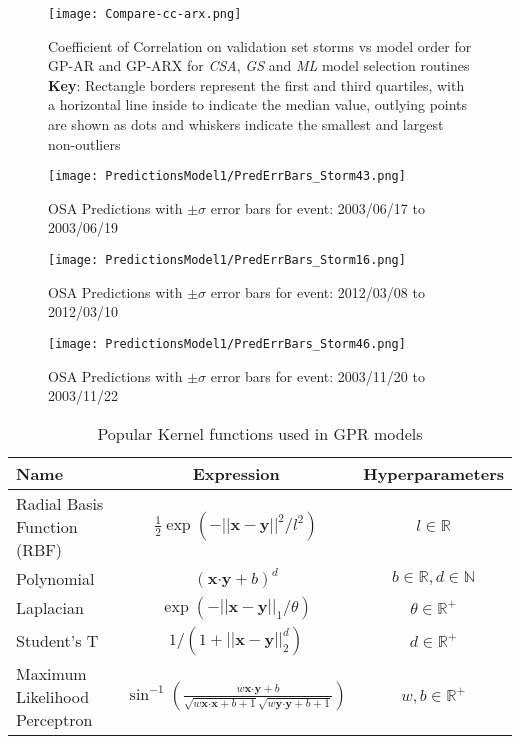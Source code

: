     \begin{figure}
    \noindent\texttt{[image: Compare-cc-arx.png]}
    \caption{Coefficient of Correlation on validation set storms vs model order for GP-AR and GP-ARX for \emph{CSA}, \emph{GS} and \emph{ML} model selection routines \\ \textbf{Key}: Rectangle borders represent the first and third quartiles, with a horizontal line inside to indicate the median value, outlying points are shown as dots and whiskers indicate the smallest and largest non-outliers}
    \label{fig:CompareCCARX}
    \end{figure}
    
    
    \begin{figure}
    \noindent\texttt{[image: PredictionsModel1/PredErrBars\_Storm43.png]}
    \caption{OSA Predictions with $\pm \sigma$ error bars for event: 2003/06/17 to 2003/06/19}
    \label{fig:ComparePred1}
    \end{figure}
    
    
    \begin{figure}
    \noindent\texttt{[image: PredictionsModel1/PredErrBars\_Storm16.png]}
    \caption{OSA Predictions with $\pm \sigma$ error bars for event: 2012/03/08 to 2012/03/10}
    \label{fig:ComparePred2}
    \end{figure}
    
    \begin{figure}
    \noindent\texttt{[image: PredictionsModel1/PredErrBars\_Storm46.png]}
    \caption{OSA Predictions with $\pm \sigma$ error bars for event: 2003/11/20 to 2003/11/22}
    \label{fig:ComparePred3}
    \end{figure}
    
    \begin{table}[h]
    \caption{Popular Kernel functions used in GPR models}
    \centering
    \begin{tabular}{l c c}
    \hline
     Name  & Expression & Hyperparameters  \\
    \hline
      Radial Basis Function (RBF)  & $\frac{1}{2} \exp(-||\mathbf{x} - \mathbf{y}||^2/l^2)$  & $l \in \mathbb{R}$   \\
      
      Polynomial  & $(\mathbf{x}\boldsymbol{\cdot} \mathbf{y} + b)^d$ & $b \in \mathbb{R}, d \in \mathbb{N}$   \\
      
      Laplacian  & $\exp(-||\mathbf{x} - \mathbf{y}||_{1}/\theta)$  & $\theta \in \mathbb{R}^+$  \\
      
      Student's T  & $1/(1 + ||\mathbf{x} - \mathbf{y}||_{2}^d)$ & $d \in \mathbb{R}^{+}$\\
      
      Maximum Likelihood Perceptron  & $\sin^{-1}(\frac{w\mathbf{x}\boldsymbol{\cdot} \mathbf{y} + b}{\sqrt{w\mathbf{x}\boldsymbol{\cdot} \mathbf{x} + b + 1} \sqrt{w\mathbf{y}\boldsymbol{\cdot} \mathbf{y} + b + 1}})$ & $w, b \in \mathbb{R}^{+}$\\
    \hline
    \end{tabular}
    \label{table:kernel}
    \end{table}
    

